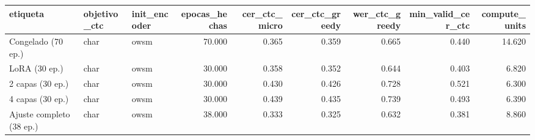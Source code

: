 \begin{tabular}{lllrrrrrr}
\toprule
etiqueta & objetivo_ctc & init_encoder & epocas_hechas & cer_ctc_micro & cer_ctc_greedy & wer_ctc_greedy & min_valid_cer_ctc & compute_units \\
\midrule
Congelado (70 ep.) & char & owsm & 70.000 & 0.365 & 0.359 & 0.665 & 0.440 & 14.620 \\
LoRA (30 ep.) & char & owsm & 30.000 & 0.358 & 0.352 & 0.644 & 0.403 & 6.820 \\
2 capas (30 ep.) & char & owsm & 30.000 & 0.430 & 0.426 & 0.728 & 0.521 & 6.300 \\
4 capas (30 ep.) & char & owsm & 30.000 & 0.439 & 0.435 & 0.739 & 0.493 & 6.390 \\
Ajuste completo (38 ep.) & char & owsm & 38.000 & 0.333 & 0.325 & 0.632 & 0.381 & 8.860 \\
\bottomrule
\end{tabular}
